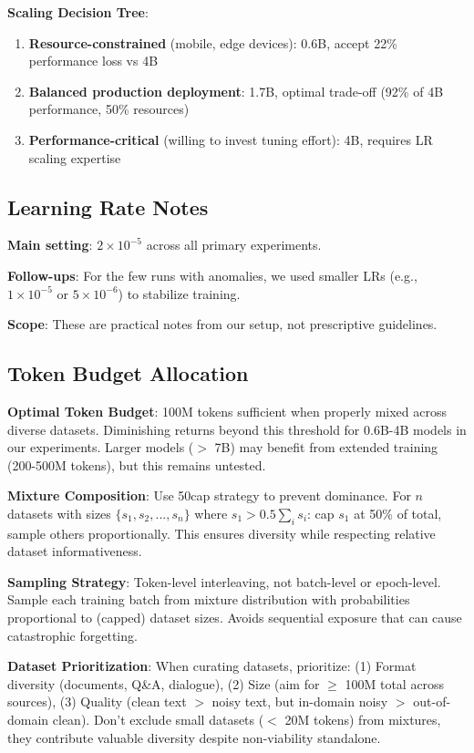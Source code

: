 \textbf{Scaling Decision Tree}:
\begin{enumerate}
\item \textbf{Resource-constrained} (mobile, edge devices): 0.6B, accept 22\% performance loss vs 4B
\item \textbf{Balanced production deployment}: 1.7B, optimal trade-off (92\% of 4B performance, 50\% resources)
\item \textbf{Performance-critical} (willing to invest tuning effort): 4B, requires LR scaling expertise
\end{enumerate}

\subsection{Learning Rate Notes}

\textbf{Main setting}: $2 \times 10^{-5}$ across all primary experiments.

\textbf{Follow-ups}: For the few runs with anomalies, we used smaller LRs (e.g., $1\times10^{-5}$ or $5\times10^{-6}$) to stabilize training.

\textbf{Scope}: These are practical notes from our setup, not prescriptive guidelines.

\subsection{Token Budget Allocation}

\textbf{Optimal Token Budget}: 100M tokens sufficient when properly mixed across diverse datasets. Diminishing returns beyond this threshold for 0.6B-4B models in our experiments. Larger models ($>$ 7B) may benefit from extended training (200-500M tokens), but this remains untested.

\textbf{Mixture Composition}: Use 50cap strategy to prevent dominance. For $n$ datasets with sizes $\{s_1, s_2, ..., s_n\}$ where $s_1 > 0.5 \sum_i s_i$: cap $s_1$ at 50\% of total, sample others proportionally. This ensures diversity while respecting relative dataset informativeness.

\textbf{Sampling Strategy}: Token-level interleaving, not batch-level or epoch-level. Sample each training batch from mixture distribution with probabilities proportional to (capped) dataset sizes. Avoids sequential exposure that can cause catastrophic forgetting.

\textbf{Dataset Prioritization}: When curating datasets, prioritize: (1) Format diversity (documents, Q\&A, dialogue), (2) Size (aim for $\geq$ 100M total across sources), (3) Quality (clean text $>$ noisy text, but in-domain noisy $>$ out-of-domain clean). Don't exclude small datasets ($<$ 20M tokens) from mixtures, they contribute valuable diversity despite non-viability standalone.

